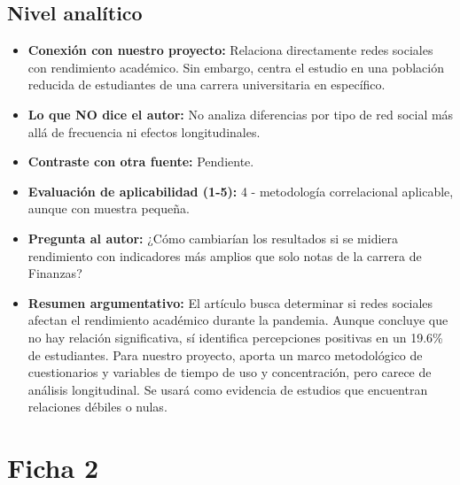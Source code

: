\documentclass[12pt]{article}
\begin{document}
\subsection*{Nivel analítico}
\begin{itemize}
  \item \textbf{Conexión con nuestro proyecto:} Relaciona directamente redes sociales con rendimiento académico. Sin embargo, centra el estudio en una población reducida de estudiantes de una carrera universitaria en específico.
  \item \textbf{Lo que NO dice el autor:} No analiza diferencias por tipo de red social más allá de frecuencia ni efectos longitudinales.
  \item \textbf{Contraste con otra fuente:} Pendiente.
  \item \textbf{Evaluación de aplicabilidad (1-5):} 4 - metodología correlacional aplicable, aunque con muestra pequeña.
  \item \textbf{Pregunta al autor:} ¿Cómo cambiarían los resultados si se midiera rendimiento con indicadores más amplios que solo notas de la carrera de Finanzas?
  \item \textbf{Resumen argumentativo:} El artículo busca determinar si redes sociales afectan el rendimiento académico durante la pandemia. Aunque concluye que no hay relación significativa, sí identifica percepciones positivas en un 19.6\% de estudiantes. Para nuestro proyecto, aporta un marco metodológico de cuestionarios y variables de tiempo de uso y concentración, pero carece de análisis longitudinal. Se usará como evidencia de estudios que encuentran relaciones débiles o nulas.
\end{itemize}

\section*{Ficha 2}
\end{document}
